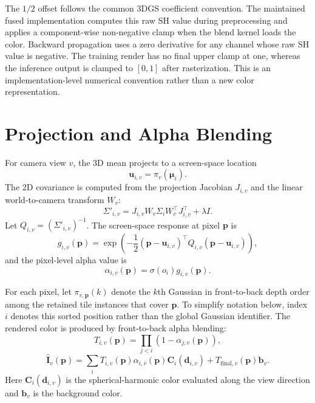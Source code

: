 The $1/2$ offset follows the common 3DGS coefficient convention. The maintained fused implementation computes this raw SH value during preprocessing and applies a component-wise non-negative clamp when the blend kernel loads the color. Backward propagation uses a zero derivative for any channel whose raw SH value is negative. The training render has no final upper clamp at one, whereas the inference output is clamped to $[0,1]$ after rasterization. This is an implementation-level numerical convention rather than a new color representation.

\section{Projection and Alpha Blending}

For camera view $v$, the 3D mean projects to a screen-space location
\begin{equation}
\mathbf{u}_{i,v}=\pi_v(\boldsymbol{\mu}_i).
\end{equation}
The 2D covariance is computed from the projection Jacobian $J_{i,v}$ and the linear world-to-camera transform $W_v$:
\begin{equation}
\Sigma'_{i,v}
=
J_{i,v} W_v \Sigma_i W_v^\top J_{i,v}^\top + \lambda I .
\end{equation}
Let $Q_{i,v}=(\Sigma'_{i,v})^{-1}$. The screen-space response at pixel $\mathbf{p}$ is
\begin{equation}
g_{i,v}(\mathbf{p}) =
\exp\left(
-\frac{1}{2}
(\mathbf{p}-\mathbf{u}_{i,v})^\top
Q_{i,v}
(\mathbf{p}-\mathbf{u}_{i,v})
\right),
\end{equation}
and the pixel-level alpha value is
\begin{equation}
\alpha_{i,v}(\mathbf{p})=
\sigma(o_i)g_{i,v}(\mathbf{p}).
\end{equation}

For each pixel, let $\pi_{v,\mathbf{p}}(k)$ denote the $k$th Gaussian in front-to-back depth order among the retained tile instances that cover $\mathbf{p}$. To simplify notation below, index $i$ denotes this sorted position rather than the global Gaussian identifier. The rendered color is produced by front-to-back alpha blending:
\begin{equation}
T_{i,v}(\mathbf{p}) =
\prod_{j<i}(1-\alpha_{j,v}(\mathbf{p})),
\end{equation}
\begin{equation}
\hat{\mathbf{I}}_v(\mathbf{p}) =
\sum_i
T_{i,v}(\mathbf{p})
\alpha_{i,v}(\mathbf{p})
\mathbf{C}_i(\mathbf{d}_{i,v})
+
T_{\mathrm{final},v}(\mathbf{p})\mathbf{b}_v .
\end{equation}
Here $\mathbf{C}_i(\mathbf{d}_{i,v})$ is the spherical-harmonic color evaluated along the view direction and $\mathbf{b}_v$ is the background color.

